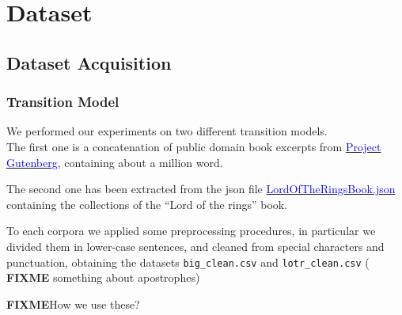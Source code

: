 \chapter{Dataset}

\section{Dataset Acquisition}
\label{section:dataset-exploration}

\subsection{Transition Model}
\label{subsection:transmodel}
We performed our experiments on two different transition models.\\
The first one is a concatenation of public domain book excerpts from \href{http://www.gutenberg.org/wiki/Main_Page}{ 
	\textcolor{blue}{Project Gutenberg}}, containing about a million word. 

The second one has been extracted from the json file 
\href{https://www.kaggle.com/mokosan/lord-of-the-rings-character-data#LordOfTheRingsBook.json}{ 
	\textcolor{blue}{LordOfTheRingsBook.json}} containing the collections of the “Lord of the rings” book.

To each corpora we applied some preprocessing procedures, in particular we divided them in lower-case sentences, and 
cleaned from special characters and punctuation, obtaining the datasets \texttt{big\_clean.csv} and 
\texttt{lotr\_clean.csv} ( \textbf{FIXME }something about apostrophes)


\textbf{FIXME}{How we use these?}

